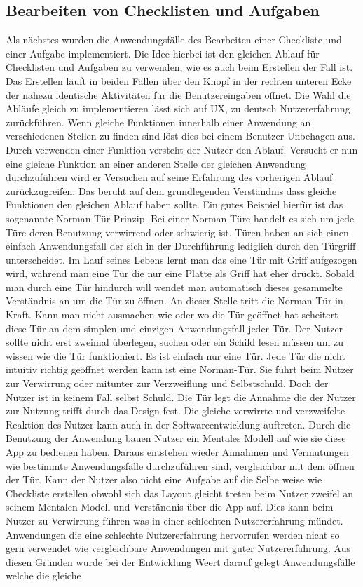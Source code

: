 \subsection{Bearbeiten von Checklisten und Aufgaben}\label{subsec:bearbeiten}

Als nächstes wurden die Anwendungsfälle des Bearbeiten einer Checkliste und einer Aufgabe implementiert. Die Idee hierbei ist den gleichen Ablauf für Checklisten und Aufgaben zu verwenden, wie es auch beim Erstellen der Fall ist. Das Erstellen läuft in beiden Fällen über den Knopf in der rechten unteren Ecke der nahezu identische Aktivitäten für die Benutzereingaben öffnet. Die Wahl die Abläufe gleich zu implementieren lässt sich auf \ac{UX}, zu deutsch Nutzererfahrung zurückführen. Wenn gleiche Funktionen innerhalb einer Anwendung an verschiedenen Stellen zu finden sind löst dies bei einem Benutzer Unbehagen aus. Durch verwenden einer Funktion versteht der Nutzer den Ablauf. Versucht er nun eine gleiche Funktion an einer anderen Stelle der gleichen Anwendung durchzuführen wird er Versuchen auf seine Erfahrung des vorherigen Ablauf zurückzugreifen. Das beruht auf dem grundlegenden Verständnis dass gleiche Funktionen den gleichen Ablauf haben sollte. Ein gutes Beispiel hierfür ist das sogenannte Norman-Tür Prinzip. Bei einer Norman-Türe handelt es sich um jede Türe deren Benutzung verwirrend oder schwierig ist. Türen haben an sich einen einfach Anwendungsfall der sich in der Durchführung lediglich durch den Türgriff unterscheidet. Im Lauf seines Lebens lernt man das eine Tür mit Griff aufgezogen wird, während man eine Tür die nur eine Platte als Griff hat eher drückt. Sobald man durch eine Tür hindurch will wendet man automatisch dieses gesammelte Verständnis an um die Tür zu öffnen. An dieser Stelle tritt die Norman-Tür in Kraft. Kann man nicht ausmachen wie oder wo die Tür geöffnet hat scheitert diese Tür an dem simplen und einzigen Anwendungsfall jeder Tür. Der Nutzer sollte nicht erst zweimal überlegen, suchen oder ein Schild lesen müssen um zu wissen wie die Tür funktioniert. Es ist einfach nur eine Tür. Jede Tür die nicht intuitiv richtig geöffnet werden kann ist eine Norman-Tür. Sie führt beim Nutzer zur Verwirrung oder mitunter zur Verzweiflung und Selbstschuld. Doch der Nutzer ist in keinem Fall selbst Schuld. Die Tür legt die Annahme die der Nutzer zur Nutzung trifft durch das Design fest. Die gleiche verwirrte und verzweifelte Reaktion des Nutzer kann auch in der Softwareentwicklung auftreten. Durch die Benutzung der Anwendung bauen Nutzer ein Mentales Modell auf wie sie diese App zu bedienen haben. Daraus entstehen wieder Annahmen und Vermutungen wie bestimmte Anwendungsfälle durchzuführen sind, vergleichbar mit dem öffnen der Tür. Kann der Nutzer also nicht eine Aufgabe auf die Selbe weise wie Checkliste erstellen obwohl sich das Layout gleicht treten beim Nutzer zweifel an seinem Mentalen Modell und Verständnis über die App auf. Dies kann beim Nutzer zu Verwirrung führen was in einer schlechten Nutzererfahrung mündet. Anwendungen die eine schlechte Nutzererfahrung hervorrufen werden nicht so gern verwendet wie vergleichbare Anwendungen mit guter Nutzererfahrung. Aus diesen Gründen wurde bei der Entwicklung Weert darauf gelegt Anwendungsfälle welche die gleiche 